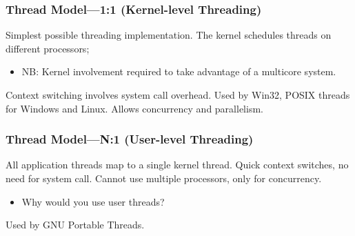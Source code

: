 \documentclass[aspectratio=43]{beamer}
\newenvironment{changemargin}[1]{%
  \begin{list}{}{%
    \setlength{\topsep}{0pt}%
    \setlength{\leftmargin}{#1}%
    \setlength{\rightmargin}{1em}
    \setlength{\listparindent}{\parindent}%
    \setlength{\itemindent}{\parindent}%
    \setlength{\parsep}{\parskip}%
  }%
  \item[]}{\end{list}}
\begin{document}
\begin{frame}
  \frametitle{Thread Model---1:1 (Kernel-level Threading)}

    \begin{changemargin}{1.5cm}

    Simplest possible threading implementation.
    \vfill
    The kernel schedules threads on different processors;
      \begin{itemize}
        \item NB: Kernel involvement required to take advantage of a multicore system.
      \end{itemize}
    \vfill
    Context switching involves system call overhead.
    \vfill
    Used by Win32, POSIX threads for Windows and Linux.
    \vfill
    Allows concurrency and parallelism.

    \end{changemargin}
\end{frame}

\begin{frame}
  \frametitle{Thread Model---N:1 (User-level Threading)}

  \begin{changemargin}{1.5cm}
    All application threads map to a single kernel thread.
    \vfill
    Quick context switches, no need for system call.
    \vfill
    Cannot use multiple processors, only for concurrency.
      \begin{itemize}
        \item Why would you use user threads?
      \end{itemize}
    \vfill
    Used by GNU Portable Threads.
  \end{changemargin}
\end{frame}
\end{document}
